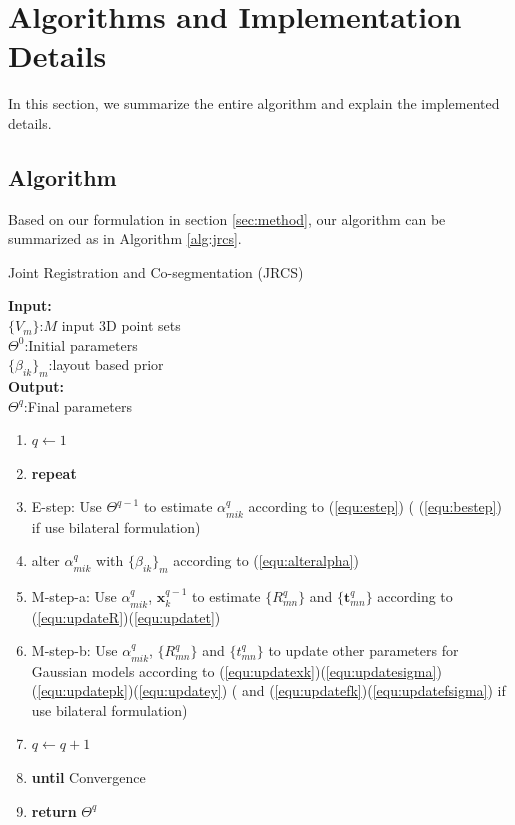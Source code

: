 \section{Algorithms and Implementation Details}
\label{sec:imp}

In this section, we summarize the entire algorithm and explain the implemented details.

\subsection{Algorithm}
Based on our formulation in section \ref{sec:method}, our algorithm can be summarized as in Algorithm \ref{alg:jrcs}.
\begin{algorithm}[htb]
	\caption{Joint Registration and Co-segmentation (JRCS)}
	\label{alg:jrcs}
	\textbf{Input:}~~\\
	$\{V_m\}$:$M$ input 3D point sets\\
	$\Theta^0$:Initial parameters~~\\
	$\{\beta_{ik}\}_{m}$:layout based prior\\
	\textbf{Output:}~~\\
	$\Theta^q$:Final parameters~~
	\begin{enumerate}
		\item $q\leftarrow1$
		\item \textbf{repeat}
		\item E-step: Use $\Theta^{q-1}$ to estimate $\alpha_{mik}^q$ according to (\ref{equ:estep}) ( (\ref{equ:bestep}) if use bilateral formulation)
		\item alter $\alpha_{mik}^q$ with $\{\beta_{ik}\}_{m}$ according to (\ref{equ:alteralpha})
		\item M-step-a: Use $\alpha^q_{mik}$, $\pmb x^{q-1}_k$ to estimate $\{R_{mn}^q\}$ and $\{\pmb t_{mn}^q\}$ according to (\ref{equ:updateR})(\ref{equ:updatet})
		\item M-step-b: Use $\alpha^q_{mik}$, $\{R_{mn}^q\}$ and $\{t_{mn}^q\}$ to update other parameters for Gaussian models according to (\ref{equ:updatexk})(\ref{equ:updatesigma})(\ref{equ:updatepk})(\ref{equ:updatey})  ( and (\ref{equ:updatefk})(\ref{equ:updatefsigma}) if use bilateral formulation)
		\item $q \leftarrow q+1$
		\item \textbf{until} Convergence
		\item \textbf{return} $\Theta^q$
	\end{enumerate}
\end{algorithm}



